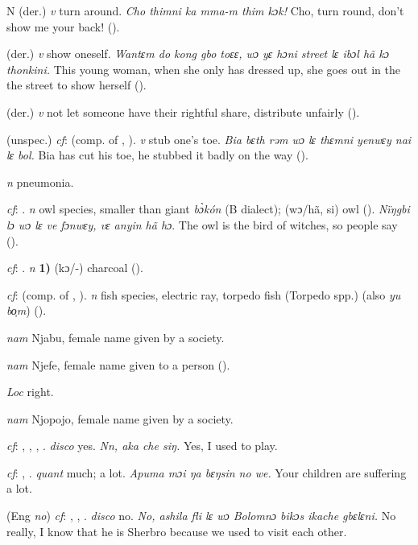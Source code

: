 \begin{letter}{N}
 (der.) \textit{v} turn around. \textit{Cho thimni ka mma-m thim kɔk!} Cho, turn round, don't show me your back! (\citealt{Pichl1967}). 

 (der.) \textit{v} show oneself. \textit{Wantɛm do kong gbo toɛɛ, wɔ yɛ hɔni street lɛ ibɔl hã kɔ thonkini.} This young woman, when she only has dressed up, she goes out in the the street to show herself (\citealt{Pichl1967}). 

 (der.) \textit{v} not let someone have their rightful share, distribute unfairly (\citealt{Pichl1967}). 

 (unspec.) \textit{cf}:  (comp. of , ). \textit{v} stub one's toe. \textit{Bia bɛth rəm wɔ lɛ thɛmni yenwɛy nai lɛ bol.} Bia has cut his toe, he stubbed it badly on the way (\citealt{Pichl1967}). 

 \textit{n} pneumonia.

 \textit{cf}: . \textit{n} owl species, smaller than giant \textit{bɔ̀kón} (B dialect); (wɔ/hã, si) owl (\citealt{Pichl1967}). \textit{Nïŋgbi lɔ wɔ lɛ ve fɔnwɛy, vɛ anyin hã hɔ}. The owl is the bird of witches, so people say (\citealt{Pichl1967}). 

 \textit{cf}: . \textit{n} \textbf{1)} (kɔ/-) charcoal (\citealt{Pichl1967}).

 \textit{cf}:  (comp. of , ). \textit{n} fish species, electric ray, torpedo fish (Torpedo spp.) (also \textit{yu bo̹m}) (\citealt{Pichl1967}). 

 \textit{nam} Njabu, female name given by a society. 

 \textit{nam} Njefe, female name given to a person (\citealt{Pichl1967}).

 \textit{Loc} right.

 \textit{nam} Njopojo, female name given by a society. 

 \textit{cf}: , , , . \textit{disco} yes. \textit{Nn, aka che siŋ.} Yes, I used to play. 

 \textit{cf}: , . \textit{quant} much; a lot. \textit{Apuma mɔi ŋa bɛŋsin no we.} Your children are suffering a lot.

 (Eng \textit{no}) \textit{cf}: , , . \textit{disco} no. \textit{No, ashila fli lɛ wɔ Bolomnɔ bikɔs ikache gbɛlɛni.} No really, I know that he is Sherbro because we used to visit each other.


\end{letter}
